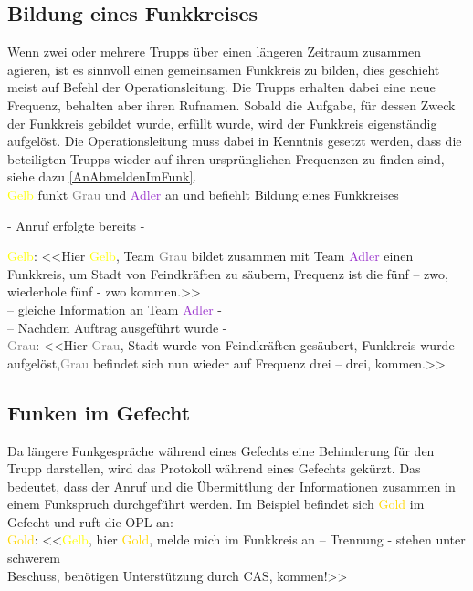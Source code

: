 \subsection{Bildung eines Funkkreises}
Wenn zwei oder mehrere Trupps über einen längeren Zeitraum zusammen agieren, ist es sinnvoll einen gemeinsamen Funkkreis zu bilden, dies geschieht meist auf Befehl der Operationsleitung. Die Trupps erhalten dabei eine neue Frequenz, behalten aber ihren Rufnamen. Sobald die Aufgabe, für dessen Zweck der Funkkreis gebildet wurde, erfüllt wurde, wird der Funkkreis eigenständig aufgelöst. Die Operationsleitung muss dabei in Kenntnis gesetzt werden, dass die beteiligten Trupps wieder auf ihren ursprünglichen Frequenzen zu finden sind, siehe dazu \autoref{AnAbmeldenImFunk}. \\
\textcolor{yellow}{Gelb} funkt \textcolor{gray}{Grau} und \textcolor{DarkOrchid}{Adler} an und befiehlt Bildung eines Funkkreises \\
\begin{center}
- Anruf erfolgte bereits -
\end{center}
\textcolor{yellow}{Gelb}: <<Hier \textcolor{yellow}{Gelb}, Team \textcolor{gray}{Grau} bildet zusammen mit Team \textcolor{DarkOrchid}{Adler} einen Funkkreis, um Stadt von Feindkräften zu säubern, Frequenz ist die fünf – zwo, wiederhole fünf - zwo kommen.>> \\
– gleiche Information an Team \textcolor{DarkOrchid}{Adler} - \\
– Nachdem Auftrag ausgeführt wurde - \\
\textcolor{gray}{Grau}: <<Hier \textcolor{gray}{Grau}, Stadt wurde von Feindkräften gesäubert, Funkkreis wurde aufgelöst,\textcolor{gray}{Grau} befindet sich nun wieder auf Frequenz drei – drei, kommen.>> \\

\subsection{Funken im Gefecht}
Da längere Funkgespräche während eines Gefechts eine Behinderung für den Trupp darstellen, wird das Protokoll während eines Gefechts gekürzt. Das bedeutet, dass der Anruf und die Übermittlung der Informationen zusammen in einem Funkspruch durchgeführt werden. Im Beispiel befindet sich \textcolor{gold}{Gold} im Gefecht und ruft die OPL an: \\
\textcolor{gold}{Gold}: <<\textcolor{yellow}{Gelb}, hier \textcolor{gold}{Gold}, melde mich im Funkkreis an – Trennung - stehen unter schwerem \\
Beschuss, benötigen Unterstützung durch CAS, kommen!>> \\

